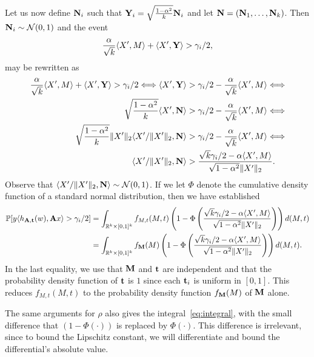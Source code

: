 Let us now define $\mathbf{N}_i$ such that $\mathbf{Y}_i = \sqrt{\frac{1-\alpha^2}{k}}\mathbf{N}_i$ and let $\mathbf{N} = (\mathbf{N}_1,\dots,\mathbf{N}_k)$. Then $\mathbf{N}_i\sim \mathcal{N}(0,1)$ and the event 
\[
\frac{\alpha}{\sqrt{k}}\langle X',M\rangle+\langle X',\mathbf{Y}\rangle > \gamma_i/2,
\]
may be rewritten as
\begin{align*}
    \frac{\alpha}{\sqrt{k}}\ipr{X',M}+\ipr{X',\rY} > \gamma_i/2 \Longleftrightarrow
    \ipr{X',\rY} &> \gamma_i/2 - \frac{\alpha}{\sqrt{k}}\ipr{X',M} \Longleftrightarrow\\
    \sqrt{\frac{1-\alpha^2}{k}}\ipr{X', \rN} &> \gamma_i/2 - \frac{\alpha}{\sqrt{k}}\ipr{X',M} \Longleftrightarrow\\
    \sqrt{\frac{1-\alpha^2}{k}}\norm{X'}_2 \ipr{X'/\|X'\|_2,\rN} &> \gamma_i/2 - \frac{\alpha}{\sqrt{k}}\ipr{X',M} \Longleftrightarrow\\
    \ipr{X'/\|X'\|_2,\rN} &> \frac{\sqrt{k}\gamma_i/2 - \alpha\ipr{X',M}}{\sqrt{1-\alpha^2}\norm{X'}_2}.
\end{align*}
Observe that $\langle X'/\|X'\|_2, \mathbf{N}\rangle \sim \mathcal{N}(0,1)$. If we let $\Phi$ denote the cumulative density function of a standard normal distribution, then we have established
\begin{align}
  \Pr[y\langle h_{\rA,\rt}(w),\rA x\rangle > \gamma_i/2] &= \int_{\R^k\times[0,1]^k} f_{M,t}(M,t)\left(1-\Phi\left(\frac{\sqrt{k}\gamma_i/2 - \alpha\ipr{X',M}}{\sqrt{1-\alpha^2}\norm{X'}_2}\right)\right) d(M,t) \nonumber \\
  &=\int_{\R^k\times[0,1]^k} f_{\rM}(M)\left(1-\Phi\left(\frac{\sqrt{k}\gamma_i/2 - \alpha\ipr{X',M}}{\sqrt{1-\alpha^2}\norm{X'}_2}\right)\right) d(M,t).
  \label{eq:integral}
  \end{align}
In the last equality, we use that $\mathbf{M}$ and $\mathbf{t}$ are independent and that the probability density function of $\mathbf{t}$ is $1$ since each $\mathbf{t}_i$ is uniform in $[0,1]$. This reduces $f_{M,t}(M,t)$ to the probability density function $f_{\mathbf{M}}(M)$ of $\mathbf{M}$ alone.
  
The same arguments for $\rho$ also gives the integral~\eqref{eq:integral}, with the small difference that $(1-\Phi(\cdot))$ is replaced by $\Phi(\cdot)$. This difference is irrelevant, since to bound the Lipschitz constant, we will differentiate and bound the differential's absolute value.

